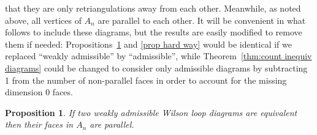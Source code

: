 \documentclass[11pt]{article}
\newtheorem{prop}[thm]{Proposition}
\theoremstyle{remark}
\theoremstyle{definition}
\begin{document}
that they are only retriangulations away from each other. Meanwhile, as noted above, all vertices of $A_n$ are parallel to each other.  It will be convenient in what follows to include these diagrams, but the results are easily modified to remove them if needed: Propositions~\ref{prop easy way} and \ref{prop hard way} would be identical if we replaced ``weakly admissible'' by ``admissible'', while Theorem~\ref{thm:count inequiv diagrams} could be changed to consider only admissible diagrams by subtracting 1 from the number of non-parallel faces in order to account for the missing dimension 0 faces.

\begin{prop}\label{prop easy way}
  If two weakly admissible Wilson loop diagrams are equivalent then their faces in $A_n$ are parallel.
\end{prop}
\end{document}
